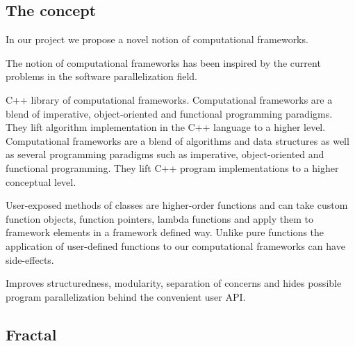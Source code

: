 \subsection{The concept}
\label{frameworks_concept}
\quad In our project we propose a novel notion of computational frameworks.

The notion of computational frameworks has been inspired by the current problems in the software parallelization field. 

C++ library of computational frameworks. Computational frameworks are a blend of imperative, object-oriented and functional programming paradigms. They lift algorithm implementation in the C++ language to a higher level.
Computational frameworks are a blend of algorithms and data structures as well as several programming paradigms such as imperative, object-oriented and functional programming. They lift C++ program implementations to a higher conceptual level. 

User-exposed methods of classes are higher-order functions and can take custom function objects, function pointers, lambda functions and apply them to framework elements in a framework defined way. Unlike pure functions the application of user-defined functions to our computational frameworks can have side-effects.

\quad Improves structuredness, modularity, separation of concerns and hides possible program parallelization behind the convenient user API.  

\subsection{Fractal}
\label{frameworks_fractal}
